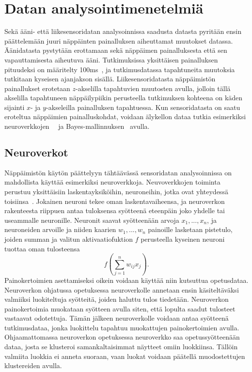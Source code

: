 \documentclass[finnish]{tktltiki2}
\theoremstyle{definition}
\theoremstyle{remark}
\begin{document}
\section{Datan analysointimenetelmiä}
Sekä ääni- että liikesensoridatan analysoinnissa saadusta datasta pyritään ensin päättelemään juuri näppäinten painalluksen aiheuttamat muutokset datassa. Äänidatasta pystytään erottamaan sekä näppäimen painalluksesta että sen vapauttamisesta aiheutuva ääni. Tutkimuksissa yksittäisen painalluksen pituudeksi on määritelty 100ms~\cite{berger}, ja tutkimusdatassa tapahtuneita muutoksia tutkitaan kyseisen ajanjakson sisällä. Liikesensoridatasta näppäimistön painallukset erotetaan $z$-akselilla tapahtuvien muutosten avulla, jolloin tällä akselilla tapahtuneen näppäilypiikin perusteella tutkimuksen kohteena on käden sijainti $x$- ja $y$-akseleilla painalluksen tapahtuessa. Kun sensoridatasta on saatu eroteltua näppäimien painalluskohdat, voidaan älykellon dataa tutkia esimerkiksi neuroverkkojen~\cite{maiti}~\cite{liu} ja Bayes-mallinnuksen~\cite{mole} avulla.

\subsection{Neuroverkot}
Näppäimistön käytön päättelyyn tähtäävässä sensoridatan analysoinnissa on mahdollista käyttää esimerkiksi neuroverkkoja. Neuvoverkkojen toiminta perustuu yksittäisiin laskentayksiköihin, neuroneihin, jotka ovat yhteydessä toisiinsa~\cite{ert}. Jokainen neuroni tekee oman laskentavaiheensa, ja neuroverkon rakenteesta riippuen antaa tuloksensa syötteenä eteenpäin joko yhdelle tai useammalle neuronille. Neuronit saavat syötteenään arvoja $x_1,..., x_n$, ja neuroneiden arvoille ja niiden kaarien $w_1,...,w_n$ painoille lasketaan pistetulo, joiden summan ja valitun aktivaatiofuktion $f$ perusteella kyseinen neuroni tuottaa oman tulosteensa $$f(\sum_{j=1}^{n} w_{ij}x_j).$$
Painokertoimien asettamiseksi oikein voidaan käyttää niin kutsuttua opetusdataa. Neuroverkon ohjatussa opetuksessa neuroverkolle annetaan ensin käsiteltäväksi valmiiksi luokiteltuja syötteitä, joiden haluttu tulos tiedetään. Neuroverkon painokertoimia muokataan syötteen avulla siten, että lopulta saadut tulosteet vastaavat odotettuja. Tämän jälkeen neuroverkolle voidaan antaa syötteenä tutkimusdataa, jonka luokittelu tapahtuu muokattujen painokertoimien avulla. Ohjaamattomassa neuroverkon opetuksessa neuroverkko saa opetussyötteenään dataa, josta se klusteroi samankaltaisimmat näytteet omiin luokkiinsa. Tällöin valmiita luokkia ei anneta suoraan, vaan luokat voidaan päätellä muodostettujen klustereiden avulla.
\end{document}
